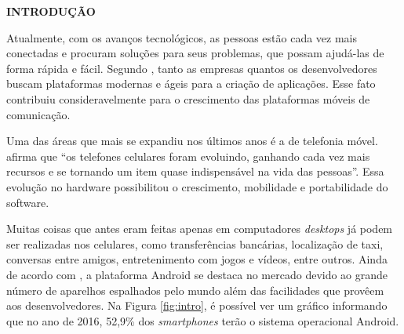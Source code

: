   \vspace{1.2em}
  \textbf{\large INTRODUÇÃO}
  \vspace{2.9em}
\thispagestyle{empty}


	\par Atualmente, com os avanços tecnológicos, as pessoas estão cada vez mais
conectadas e procuram soluções para seus problemas, que possam ajudá-las de
forma rápida e fácil.  Segundo , tanto as empresas
quantos os desenvolvedores buscam plataformas modernas e ágeis para a criação
de aplicações. Esse fato contribuiu consideravelmente para o crescimento das
plataformas móveis de comunicação.

	\par Uma das áreas que mais se expandiu nos últimos anos é a de telefonia
móvel.  afirma que “os telefones celulares foram
evoluindo, ganhando cada vez mais recursos e se tornando um item quase
indispensável na vida das pessoas”. Essa evolução no hardware possibilitou o
crescimento, mobilidade e portabilidade do software.

	\par Muitas coisas que antes eram feitas apenas em computadores
\textit{desktops} já podem ser realizadas nos celulares, como transferências
bancárias, localização de taxi, conversas entre amigos, entretenimento com
jogos e vídeos, entre outros. Ainda de acordo com , a
plataforma Android se destaca no mercado devido ao grande número de
aparelhos espalhados pelo mundo além das facilidades que provêem aos
desenvolvedores. Na Figura \ref{fig:intro}, é possível ver um gráfico
informando que no ano de 2016, 52,9\% dos \textit{smartphones} terão o sistema
operacional Android.

